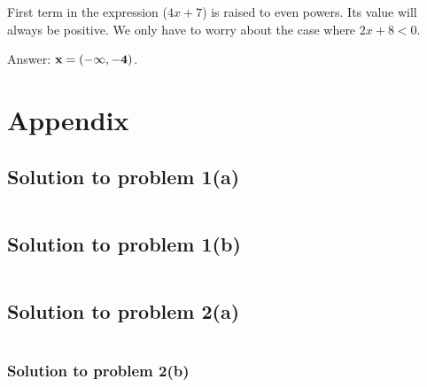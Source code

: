 \documentclass[answers,addpoints]{exam}
\begin{document}
\begin{questions}
\begin{parts}
\begin{solution}
    First term in the expression ($4x+7$) is raised to even powers.
    Its value will always be positive. We only have to worry about the case where
    $2x+8<0$.  

    Answer: $\bf x = (-\infty, -4)$.  


\end{solution}

\end{parts}

\end{questions}

\section{Appendix}
\subsection{Solution to problem 1(a)}
\scriptsize
\inputminted{python}{./sol1_a.py}

\subsection{Solution to problem 1(b)}
\scriptsize
\inputminted{python}{./sol1_b.py}

\subsection{Solution to problem 2(a)}
\scriptsize
\inputminted{python}{./sol2_a.py}

\subsubsection{Solution to problem 2(b)}
\scriptsize
\inputminted{python}{./sol2_b.py}
\end{document}
